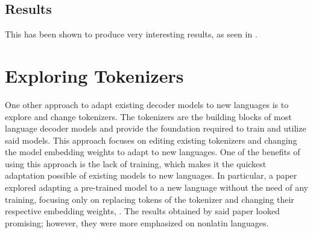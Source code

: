 \subsection{Results}
This has been shown to produce very interesting results, as seen in .\\


\section{Exploring Tokenizers}\label{Section3.2}
One other approach to adapt existing decoder models to new languages is to explore and change tokenizers. The tokenizers are the building blocks of most language decoder models and provide the foundation required to train and utilize said models.
This approach focuses on editing existing tokenizers and changing the model embedding weights to adapt to new languages. One of the benefits of using this approach is the lack of training, which makes it the quickest adaptation possible of existing models to new languages.
In particular, a paper explored adapting a pre-trained model to a new language without the need of any training, focusing only on replacing tokens of the tokenizer and changing their respective embedding weights, \citet{AdaptinigPretrainedModels}.
The results obtained by said paper looked promising; however, they were more emphasized on nonlatin languages. 






